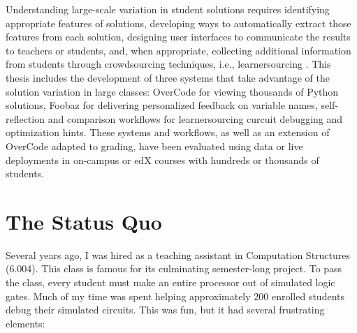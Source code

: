 Understanding large-scale variation in student solutions requires identifying appropriate features of solutions, developing ways to automatically extract those features from each solution, designing user interfaces to communicate the results to teachers or students, and, when appropriate, collecting additional information from students through crowdsourcing techniques, i.e., learnersourcing \cite{kim2013learnersourcing}. This thesis includes the development of three systems that take advantage of the solution variation in large classes: OverCode for viewing thousands of Python solutions, Foobaz for delivering personalized feedback on variable names, self-reflection and comparison workflows for learnersourcing curcuit debugging and optimization hints. These systems and workflows, as well as an extension of OverCode adapted to grading, have been evaluated using data or live deployments in on-campus or edX courses with hundreds or thousands of students.

\section{The Status Quo}

Several years ago, I was hired as a teaching assistant in Computation Structures (6.004). This class is famous for its culminating semester-long project. To pass the class, every student must make an entire processor out of simulated logic gates. Much of my time was spent helping approximately 200 enrolled students debug their simulated circuits. This was fun, but it had several frustrating elements:

